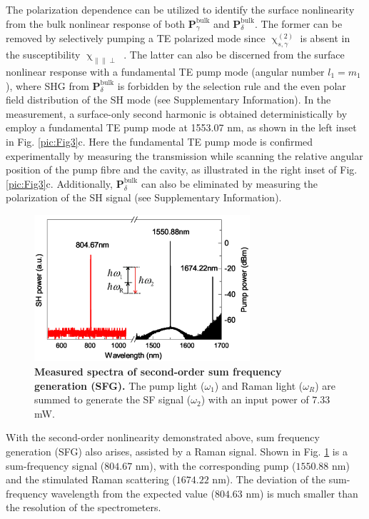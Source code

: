 \documentclass[a4paper,8pt,hyperref, twocolumn, aps, prl]{article}
\begin{document}
The polarization dependence can be utilized to identify the surface nonlinearity from the bulk nonlinear response of both $\mathbf{P}^{\mathrm{bulk}}_\gamma$ and $\mathbf{P}^{\mathrm{bulk}}_\delta$. 
The former can be removed by selectively pumping a TE polarized mode since $\upchi^{(2)}_{s,\gamma}$ is absent in the susceptibility $\upchi_{\parallel \parallel \perp}$ \cite{heinz1991second}. 
The latter can also be discerned from the surface nonlinear response with a fundamental TE pump mode (angular number $l_1=m_1$), where SHG from $\mathbf{P}^{\mathrm{bulk}}_\delta$ is forbidden by the selection rule and the even polar field distribution of the SH mode (see Supplementary Information).  
In the measurement, a surface-only second harmonic is obtained deterministically by employ a fundamental TE pump mode at 1553.07 nm, as shown in the left inset in Fig. \ref{pic:Fig3}c.
Here the fundamental TE pump mode is confirmed experimentally by measuring the transmission while scanning the relative angular position of the pump fibre and the cavity, as illustrated in the right inset of Fig. \ref{pic:Fig3}c.
Additionally, $\mathbf{P}^{\mathrm{bulk}}_\delta$ can also be eliminated by measuring the polarization of the SH signal (see Supplementary Information). 

\begin{figure}[!ht]
\centering
\includegraphics[width=8cm]{Fig4.eps}
\caption{\textbf{Measured spectra of second-order sum frequency generation (SFG). }The pump light ($\omega_1$) and Raman light ($\omega_R$) are summed to generate the SF signal ($\omega_2$) with an input power of $7.33$ mW.}
\label{pic:Fig4}
\end{figure}

With the second-order nonlinearity demonstrated above, sum frequency generation (SFG) also arises, assisted by a Raman signal. 
Shown in Fig. \ref{pic:Fig4} is a sum-frequency signal ($804.67$ nm), with the corresponding pump ($1550.88$ nm) and the stimulated Raman scattering ($1674.22$ nm).
The deviation of the sum-frequency wavelength from the expected value ($804.63$ nm) is much smaller than the resolution of the spectrometers.
\end{document}
